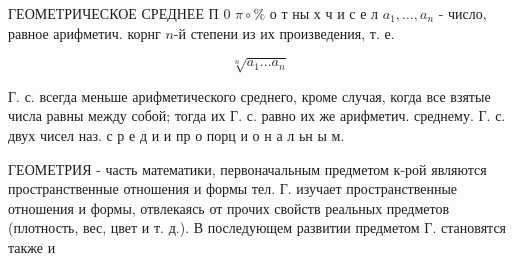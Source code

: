 \documentclass[10pt]{article}
\begin{document}
ГЕОМЕТРИЧЕСКОЕ СРЕДНЕЕ П 0 $\pi \circ \%$ $о$ т ны х ч и с е л $a_{1}, \ldots, a_{n}$ - число, равное арифметич. корнг $n$-й степени из их произведения, т. е.



\[

\sqrt[n]{a_{1} \ldots a_{n}}

\]



Г. с. всегда меньше арифметического среднего, кроме случая, когда все взятые числа равны между собой; тогда их Г. с. равно их же арифметич. среднему. Г. с. двух чисел наз. с р е д и и пр о порц и о н а л ьн ы м.



ГЕОМЕТРИЯ - часть математики, первоначальным предметом к-рой являются пространственные отношения и формы тел. Г. изучает пространственные отношения и формы, отвлекаясь от прочих свойств реальных предметов (плотность, вес, цвет и т. д.). В последующем развитии предметом Г. становятся также и
\end{document}
